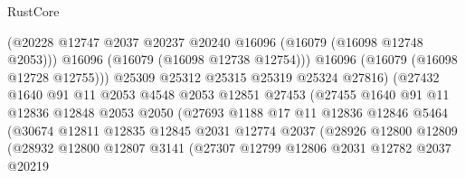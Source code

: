 \begin{lexlean}{RustCore}
\begin{coremodule}
                                  (@20228
                                    @12747
                                    @2037
                                    @20237
                                    @20240
                                    @16096
                                    (@16079 (@16098 @12748 @2053)))
                                  @16096
                                  (@16079 (@16098 @12738 @12754)))
                                @16096
                                (@16079 (@16098 @12728 @12755)))
                              @25309
                              @25312
                              @25315
                              @25319
                              @25324
                              @27816)
                            (@27432
                              @1640
                              @91
                              @11
                              @2053
                              @4548
                              @2053
                              @12851
                              @27453
                              (@27455
                                @1640
                                @91
                                @11
                                @12836
                                @12848
                                @2053
                                @2050
                                (@27693
                                  @1188
                                  @17
                                  @11
                                  @12836
                                  @12846
                                  @5464
                                  (@30674
                                    @12811
                                    @12835
                                    @12845
                                    @2031
                                    @12774
                                    @2037
                                    (@28926
                                      @12800
                                      @12809
                                      (@28932
                                        @12800
                                        @12807
                                        @3141
                                        (@27307
                                          @12799
                                          @12806
                                          @2031
                                          @12782
                                          @2037
                                          @20219

\end{coremodule}
\end{lexlean}
